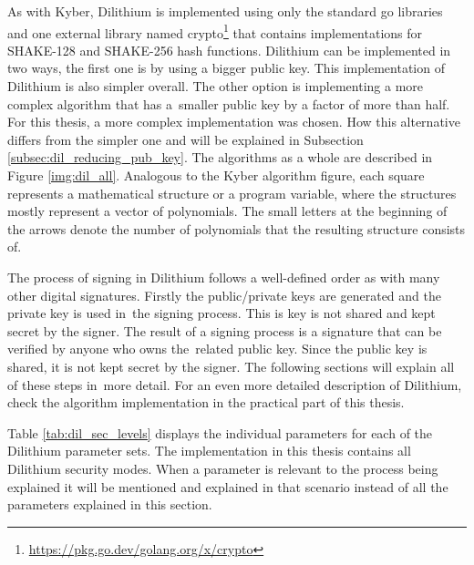 As with Kyber, Dilithium is implemented using only the standard go libraries and one external library named crypto\footnote{\url{https://pkg.go.dev/golang.org/x/crypto}} that contains implementations for SHAKE-128 and SHAKE-256 hash functions. Dilithium can be implemented in two ways, the first one is by using a bigger public key. This implementation of Dilithium is also simpler overall. The other option is implementing a more complex algorithm that has a~smaller public key by a factor of more than half. For this thesis, a more complex implementation was chosen. How this alternative differs from the simpler one and will be explained in Subsection \ref{subsec:dil_reducing_pub_key}. The algorithms as a whole are described in Figure \ref{img:dil_all}. Analogous to the Kyber algorithm figure, each square represents a mathematical structure or a program variable, where the structures mostly represent a vector of polynomials. The small letters at the beginning of the arrows denote the number of polynomials that the resulting structure consists of.

The process of signing in Dilithium follows a well-defined order as with many other digital signatures. Firstly the public/private keys are generated and the private key is used in~the signing process. This is key is not shared and kept secret by the signer. The result of a signing process is a signature that can be verified by anyone who owns the~related public key. Since the public key is shared, it is not kept secret by the signer. The following sections will explain all of these steps in~more detail. For an even more detailed description of Dilithium, check the algorithm implementation in the practical part of this thesis.


Table \ref{tab:dil_sec_levels} displays the individual parameters for each of the Dilithium parameter sets. The implementation in this thesis contains all Dilithium security modes. When a parameter is relevant to the process being explained it will be mentioned and explained in that scenario instead of all the parameters explained in this section.
